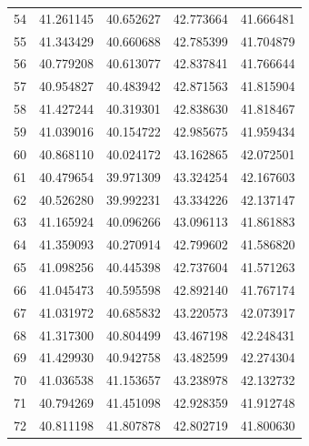 \begin{table}
\begin{tabular}{rrrrr}
54 & 41.261145 & 40.652627 & 42.773664 & 41.666481 \\
55 & 41.343429 & 40.660688 & 42.785399 & 41.704879 \\
56 & 40.779208 & 40.613077 & 42.837841 & 41.766644 \\
57 & 40.954827 & 40.483942 & 42.871563 & 41.815904 \\
58 & 41.427244 & 40.319301 & 42.838630 & 41.818467 \\
59 & 41.039016 & 40.154722 & 42.985675 & 41.959434 \\
60 & 40.868110 & 40.024172 & 43.162865 & 42.072501 \\
61 & 40.479654 & 39.971309 & 43.324254 & 42.167603 \\
62 & 40.526280 & 39.992231 & 43.334226 & 42.137147 \\
63 & 41.165924 & 40.096266 & 43.096113 & 41.861883 \\
64 & 41.359093 & 40.270914 & 42.799602 & 41.586820 \\
65 & 41.098256 & 40.445398 & 42.737604 & 41.571263 \\
66 & 41.045473 & 40.595598 & 42.892140 & 41.767174 \\
67 & 41.031972 & 40.685832 & 43.220573 & 42.073917 \\
68 & 41.317300 & 40.804499 & 43.467198 & 42.248431 \\
69 & 41.429930 & 40.942758 & 43.482599 & 42.274304 \\
70 & 41.036538 & 41.153657 & 43.238978 & 42.132732 \\
71 & 40.794269 & 41.451098 & 42.928359 & 41.912748 \\
72 & 40.811198 & 41.807878 & 42.802719 & 41.800630 \\
\bottomrule
\end{tabular}
\end{table}
